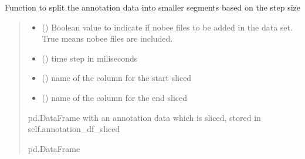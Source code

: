 \documentclass[letterpaper,10pt,english]{sphinxmanual}
\begin{document}
\begin{fulllineitems}
\begin{fulllineitems}
\label{\detokenize{BeeData:BeeData.BeeData.time_slice}}
\pysigstartsignatures
{}
\pysigstopsignatures
\sphinxAtStartPar
Function to split the annotation data into smaller segments based on the step size
\begin{quote}\begin{description}
\begin{itemize}
\item {} 
\sphinxAtStartPar
{} () \textendash{} Boolean value to indicate if nobee files to be added in the data set. True means nobee files are included.

\item {} 
\sphinxAtStartPar
{} () \textendash{} time step in miliseconds

\item {} 
\sphinxAtStartPar
{} () \textendash{} name of the column for the start sliced

\item {} 
\sphinxAtStartPar
{} () \textendash{} name of the column for the end sliced

\end{itemize}

\sphinxAtStartPar
pd.DataFrame with an annotation data which is sliced, stored in self.annotation\_df\_sliced

\sphinxAtStartPar
pd.DataFrame

\end{description}\end{quote}

\end{fulllineitems}


\end{fulllineitems}
\end{document}
